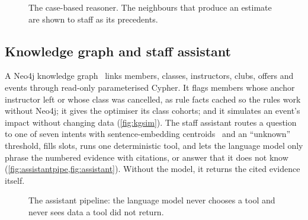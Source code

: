 \documentclass[paper=a4, fontsize=11pt, open=any, parskip=half-,
  headings=small, numbers=noenddot, captions=tableheading, toc=flat]{scrreprt}
\begin{document}
\begin{figure}[!htb]
  \centering
  
  \caption{The case-based reasoner. The neighbours that produce an estimate are shown to staff as its precedents.}
  \label{fig:cbr}
\end{figure}

\subsection{Knowledge graph and staff assistant}

A Neo4j knowledge graph~\cite{hogan2021kg} links members, classes, instructors, clubs, offers and events through read-only parameterised Cypher. It flags members whose anchor instructor left or whose class was cancelled, as rule facts cached so the rules work without Neo4j; it gives the optimiser its class cohorts; and it simulates an event's impact without changing data (\cref{fig:kgsim}). The staff assistant routes a question to one of seven intents with sentence-embedding centroids~\cite{reimers2019sbert} and an \enquote{unknown} threshold, fills slots, runs one deterministic tool, and lets the language model only phrase the numbered evidence with citations, or answer that it does not know (\cref{fig:assistantpipe,fig:assistant}). Without the model, it returns the cited evidence itself.

\begin{figure}[!htb]
  \centering
  \caption{The assistant pipeline: the language model never chooses a tool and never sees data a tool did not return.}
  \label{fig:assistantpipe}
\end{figure}
\end{document}
